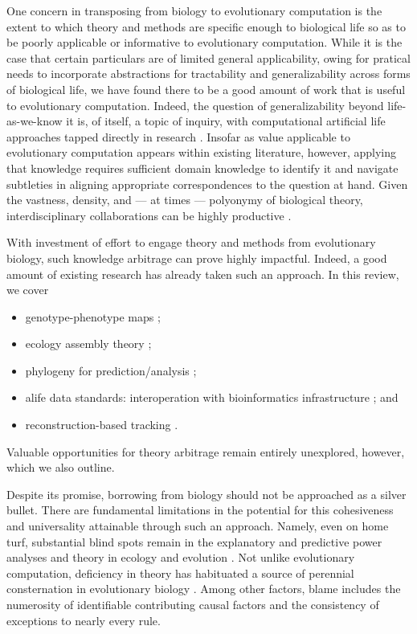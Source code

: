 One concern in transposing from biology to evolutionary computation is the extent to which theory and methods are specific enough to biological life so as to be poorly applicable or informative to evolutionary computation.
While it is the case that certain particulars are of limited general applicability, owing for pratical needs to incorporate abstractions for tractability and generalizability across forms of biological life, we have found there to be a good amount of work that is useful to evolutionary computation.
Indeed, the question of generalizability beyond life-as-we-know it is, of itself, a topic of inquiry, with computational artificial life approaches tapped directly in research \citep{cleland2013general}.
Insofar as value applicable to evolutionary computation appears within existing literature, however, applying that knowledge requires sufficient domain knowledge to identify it and navigate subtleties in aligning appropriate correspondences to the question at hand.
Given the vastness, density, and --- at times --- polyonymy of biological theory, interdisciplinary collaborations can be highly productive \citep{goodman2020evolution}.

With investment of effort to engage theory and methods from evolutionary biology, such knowledge arbitrage can prove highly impactful.
Indeed, a good amount of existing research has already taken such an approach.
In this review, we cover
\begin{itemize}
  \item genotype-phenotype maps \citep{TODO};
  \item ecology assembly theory \citep{dolson2024reachability};
  \item phylogeny for prediction/analysis \citep{hernandez2022can,shahbandegan2022untangling};
  \item alife data standards: interoperation with bioinformatics infrastructure \citep{lalejini2019data,moreno2024apc}; and
  \item reconstruction-based tracking \citep{moreno2022hstrat,moreno2024ecology}.
\end{itemize}
Valuable opportunities for theory arbitrage remain entirely unexplored, however, which we also outline.

Despite its promise, borrowing from biology should not be approached as a silver bullet.
There are fundamental limitations in the potential for this cohesiveness and universality attainable through such an approach.
Namely, even on home turf, substantial blind spots remain in the explanatory and predictive power analyses and theory in ecology and evolution \citep{TODO}.
Not unlike evolutionary computation, deficiency in theory has habituated a source of perennial consternation in evolutionary biology \citep{welch2017wrong}.
Among other factors, blame includes the numerosity of identifiable contributing causal factors and the consistency of exceptions to nearly every rule.

